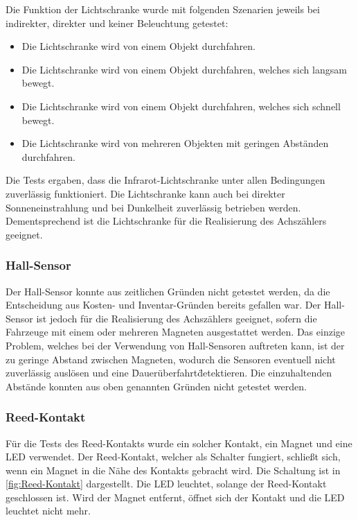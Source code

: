 Die Funktion der Lichtschranke wurde mit folgenden Szenarien jeweils bei indirekter, direkter und keiner Beleuchtung getestet:

\begin{itemize}
    \item Die Lichtschranke wird von einem Objekt durchfahren.
    \item Die Lichtschranke wird von einem Objekt durchfahren, welches sich langsam bewegt.
    \item Die Lichtschranke wird von einem Objekt durchfahren, welches sich schnell bewegt.
    \item Die Lichtschranke wird von mehreren Objekten mit geringen Abständen durchfahren.
\end{itemize}

Die Tests ergaben, dass die Infrarot-Lichtschranke unter allen Bedingungen zuverlässig funktioniert. Die Lichtschranke kann auch bei direkter Sonneneinstrahlung und bei Dunkelheit zuverlässig betrieben werden. Dementsprechend ist die Lichtschranke für die Realisierung des Achszählers geeignet.

\subsubsection{Hall-Sensor}\label{text:Entwicklung-der-GFA:Achszähler:Sensor-Tests:Hall-Sensor}

Der Hall-Sensor konnte aus zeitlichen Gründen nicht getestet werden, da die Entscheidung aus Kosten- und Inventar-Gründen bereits gefallen war. Der Hall-Sensor ist jedoch für die Realisierung des Achszählers geeignet, sofern die Fahrzeuge mit einem oder mehreren Magneten ausgestattet werden. Das einzige Problem, welches bei der Verwendung von Hall-Sensoren auftreten kann, ist der zu geringe Abstand zwischen Magneten, wodurch die Sensoren eventuell nicht zuverlässig auslösen und eine \"Dauerüberfahrt\" detektieren. Die einzuhaltenden Abstände konnten aus oben genannten Gründen nicht getestet werden.

\subsubsection{Reed-Kontakt}\label{text:Entwicklung-der-GFA:Achszähler:Sensor-Tests:Reed-Kontakt}

Für die Tests des Reed-Kontakts wurde ein solcher Kontakt, ein Magnet und eine LED verwendet. Der Reed-Kontakt, welcher als Schalter fungiert, schließt sich, wenn ein Magnet in die Nähe des Kontakts gebracht wird. Die Schaltung ist in \autoref{fig:Reed-Kontakt} dargestellt. Die LED leuchtet, solange der Reed-Kontakt geschlossen ist. Wird der Magnet entfernt, öffnet sich der Kontakt und die LED leuchtet nicht mehr.

